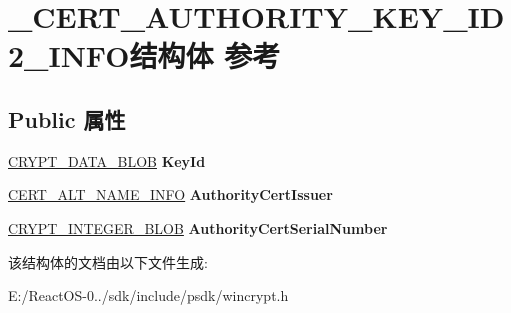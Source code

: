 \hypertarget{struct___c_e_r_t___a_u_t_h_o_r_i_t_y___k_e_y___i_d2___i_n_f_o}{}\section{\+\_\+\+C\+E\+R\+T\+\_\+\+A\+U\+T\+H\+O\+R\+I\+T\+Y\+\_\+\+K\+E\+Y\+\_\+\+I\+D2\+\_\+\+I\+N\+F\+O结构体 参考}
\label{struct___c_e_r_t___a_u_t_h_o_r_i_t_y___k_e_y___i_d2___i_n_f_o}
\subsection*{Public 属性}
\begin{DoxyCompactItemize}
\item 
\mbox{\label{struct___c_e_r_t___a_u_t_h_o_r_i_t_y___k_e_y___i_d2___i_n_f_o_a7875801fd930fe209dbcf5ace8ca1df9}} 
\hyperlink{struct___c_r_y_p_t_o_a_p_i___b_l_o_b}{C\+R\+Y\+P\+T\+\_\+\+D\+A\+T\+A\+\_\+\+B\+L\+OB} {\bfseries Key\+Id}
\item 
\mbox{\label{struct___c_e_r_t___a_u_t_h_o_r_i_t_y___k_e_y___i_d2___i_n_f_o_aec8ce26a08c2c777db3bb92de471f76a}} 
\hyperlink{struct___c_e_r_t___a_l_t___n_a_m_e___i_n_f_o}{C\+E\+R\+T\+\_\+\+A\+L\+T\+\_\+\+N\+A\+M\+E\+\_\+\+I\+N\+FO} {\bfseries Authority\+Cert\+Issuer}
\item 
\mbox{\label{struct___c_e_r_t___a_u_t_h_o_r_i_t_y___k_e_y___i_d2___i_n_f_o_aa25c5cec2ff36c2c51a0f4043efa0af9}} 
\hyperlink{struct___c_r_y_p_t_o_a_p_i___b_l_o_b}{C\+R\+Y\+P\+T\+\_\+\+I\+N\+T\+E\+G\+E\+R\+\_\+\+B\+L\+OB} {\bfseries Authority\+Cert\+Serial\+Number}
\end{DoxyCompactItemize}


该结构体的文档由以下文件生成\+:\begin{DoxyCompactItemize}
\item 
E\+:/\+React\+O\+S-\/0../sdk/include/psdk/wincrypt.\+h\end{DoxyCompactItemize}
